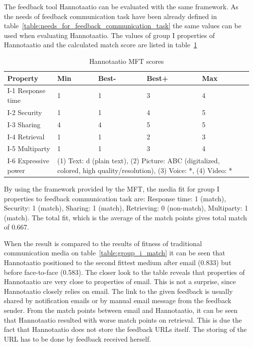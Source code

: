 \documentclass[english,12pt,a4paper,pdftex]{article}
\begin{document}
The feedback tool Hannotaatio can be evaluated with the same framework. As the needs of feedback communication task have been already defined in table~\ref{table:needs_for_feedback_communication_task} the same values can be used when evaluating Hannotaatio. The values of group I properties of Hannotaatio and the calculated match score are listed in table~\ref{table:hannotaatio_mft_scores}

\begin{table}[!h]
\renewcommand{\arraystretch}{1.3}
\caption{Hannotaatio \ac{MFT} scores}
\label{table:hannotaatio_mft_scores}
\centering
\begin{tabular}{|p{3cm}|p{2cm}|p{2cm}|p{2cm}|p{2cm}|p{2cm}|}
\hline
\textbf{Property} & \textbf{Min} & \textbf{Best-} & \textbf{Best+} & \textbf{Max}\\
\hline
I-1 Response time & 1 & 1 & 3 & 4 \\
\hline
I-2 Security & 1 & 1 & 4 & 5 \\
\hline
I-3 Sharing & 4 & 4 & 5 & 5 \\
\hline
I-4 Retrieval & 1 & 1 & 2 & 3 \\
\hline
I-5 Multiparty & 1 & 1 & 3 & 4 \\
\hline
I-6 Expressive power & \multicolumn{4}{|p{10cm}|}{(1) Text: d (plain text), (2) Picture: ABC (digitalized, colored, high quality/resolution), (3) Voice: *, (4) Video: * } \\
\hline
\end{tabular}
\end{table}

By using the framework provided by the \ac{MFT}, the media fit for group I properties to feedback communication task are: Response time: 1 (match), Security: 1 (match), Sharing: 1 (match), Retrieving: 0 (non-match), Multiparty: 1 (match). The total fit, which is the average of the match points gives total match of 0.667.

When the result is compared to the results of fitness of traditional communication media on table~\ref{table:group_i_match} it can be seen that Hannotaatio positioned to the second fittest medium after email (0.833) but before face-to-face (0.583). The closer look to the table reveals that properties of Hannotaatio are very close to properties of email. This is not a surprise, since Hannotaatio closely relies on email. The link to the given feedback is usually shared by notification emails or by manual email message from the feedback sender. From the match points between email and Hannotaatio, it can be seen that Hannotaatio resulted with worse match points on retrieval. This is due the fact that Hannotaatio does not store the feedback \acs{URL}s itself. The storing of the \ac{URL} has to be done by feedback received herself.
\end{document}
